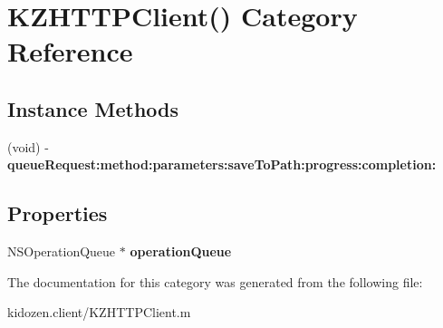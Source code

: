 \hypertarget{category_k_z_h_t_t_p_client_07_08}{\section{K\-Z\-H\-T\-T\-P\-Client() Category Reference}
\label{category_k_z_h_t_t_p_client_07_08}
}
\subsection*{Instance Methods}
\begin{DoxyCompactItemize}
\item 
\hypertarget{category_k_z_h_t_t_p_client_07_08_adec3bbea4ebfa5850fee4a786d4d8275}{(void) -\/ {\bfseries queue\-Request\-:method\-:parameters\-:save\-To\-Path\-:progress\-:completion\-:}}\label{category_k_z_h_t_t_p_client_07_08_adec3bbea4ebfa5850fee4a786d4d8275}

\end{DoxyCompactItemize}
\subsection*{Properties}
\begin{DoxyCompactItemize}
\item 
\hypertarget{category_k_z_h_t_t_p_client_07_08_a5f3cd61c0f4368fac72591095d2be38f}{N\-S\-Operation\-Queue $\ast$ {\bfseries operation\-Queue}}\label{category_k_z_h_t_t_p_client_07_08_a5f3cd61c0f4368fac72591095d2be38f}

\end{DoxyCompactItemize}


The documentation for this category was generated from the following file\-:\begin{DoxyCompactItemize}
\item 
kidozen.\-client/K\-Z\-H\-T\-T\-P\-Client.\-m\end{DoxyCompactItemize}
